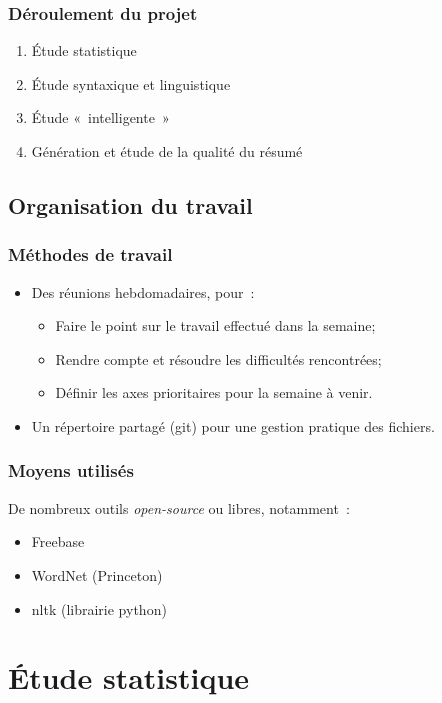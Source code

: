 \documentclass{beamer}
\begin{document}
\begin{frame}
\frametitle{Déroulement du projet}

\begin{enumerate}
\item Étude statistique
\item Étude syntaxique et linguistique
\item Étude «~intelligente~»
\item Génération et étude de la qualité du résumé
\end{enumerate}

\end{frame}

\subsection{Organisation du travail}

\begin{frame}
\frametitle{Méthodes de travail}
	\begin{itemize}
		\item Des réunions hebdomadaires, pour~:
		\begin{itemize}
			\item Faire le point sur le travail effectué dans la semaine;
			\item Rendre compte et résoudre les difficultés rencontrées;
			\item Définir les axes prioritaires pour la semaine à venir.
		\end{itemize}
		\item Un répertoire partagé (git) pour une gestion pratique des fichiers.
	\end{itemize}
\end{frame}

\begin{frame}
\frametitle{Moyens utilisés}

De nombreux outils \textit{open-source} ou libres, notamment~:
\begin{itemize}
 \item Freebase
 \item WordNet (Princeton)
 \item nltk (librairie python)
\end{itemize}
\end{frame}



\section{Étude statistique}%
\end{document}
